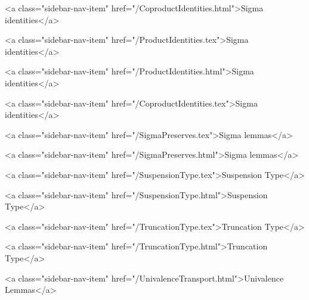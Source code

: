       
    
      
        
          <a class="sidebar-nav-item" href="/CoproductIdentities.html">Sigma identities</a>
        
      
    
      
        
          <a class="sidebar-nav-item" href="/ProductIdentities.tex">Sigma identities</a>
        
      
    
      
        
          <a class="sidebar-nav-item" href="/ProductIdentities.html">Sigma identities</a>
        
      
    
      
        
          <a class="sidebar-nav-item" href="/CoproductIdentities.tex">Sigma identities</a>
        
      
    
      
        
          <a class="sidebar-nav-item" href="/SigmaPreserves.tex">Sigma lemmas</a>
        
      
    
      
        
          <a class="sidebar-nav-item" href="/SigmaPreserves.html">Sigma lemmas</a>
        
      
    
      
        
          <a class="sidebar-nav-item" href="/SuspensionType.tex">Suspension Type</a>
        
      
    
      
        
          <a class="sidebar-nav-item" href="/SuspensionType.html">Suspension Type</a>
        
      
    
      
        
          <a class="sidebar-nav-item" href="/TruncationType.tex">Truncation Type</a>
        
      
    
      
        
          <a class="sidebar-nav-item" href="/TruncationType.html">Truncation Type</a>
        
      
    
      
        
          <a class="sidebar-nav-item" href="/UnivalenceTransport.html">Univalence Lemmas</a>
        
